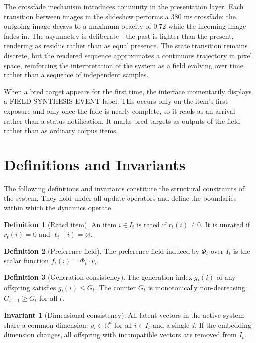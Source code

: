 \documentclass[12pt, a4paper]{article}
\theoremstyle{definition}
\newtheorem{defn}{Definition}[section]
\newtheorem{invariant}{Invariant}[section]
\begin{document}
The crossfade mechanism introduces continuity in the presentation layer. Each transition between images in the slideshow performs a 380 ms crossfade: the outgoing image decays to a maximum opacity of 0.72 while the incoming image fades in. The asymmetry is deliberate---the past is lighter than the present, rendering as residue rather than as equal presence. The state transition remains discrete, but the rendered sequence approximates a continuous trajectory in pixel space, reinforcing the interpretation of the system as a field evolving over time rather than a sequence of independent samples.

When a bred target appears for the first time, the interface momentarily displays a FIELD SYNTHESIS EVENT label. This occurs only on the item's first exposure and only once the fade is nearly complete, so it reads as an arrival rather than a status notification. It marks bred targets as outputs of the field rather than as ordinary corpus items.

\section{Definitions and Invariants}

The following definitions and invariants constitute the structural constraints of the system. They hold under all update operators and define the boundaries within which the dynamics operate.

\begin{defn}[Rated item]
An item $i \in I_t$ is rated if $r_t(i) \neq 0$. It is unrated if $r_t(i) = 0$ and $\ell_t(i) = \varnothing$.
\end{defn}

\begin{defn}[Preference field]
The preference field induced by $\Phi_t$ over $I_t$ is the scalar function $f_t(i) = \Phi_t \cdot v_i$.
\end{defn}

\begin{defn}[Generation consistency]
The generation index $g_t(i)$ of any offspring satisfies $g_t(i) \le G_t$. The counter $G_t$ is monotonically non-decreasing: $G_{t+1} \ge G_t$ for all $t$.
\end{defn}

\begin{invariant}[Dimensional consistency]
All latent vectors in the active system share a common dimension: $v_i \in \mathbb{R}^d$ for all $i \in I_t$ and a single $d$. If the embedding dimension changes, all offspring with incompatible vectors are removed from $I_t$.
\end{invariant}
\end{document}
